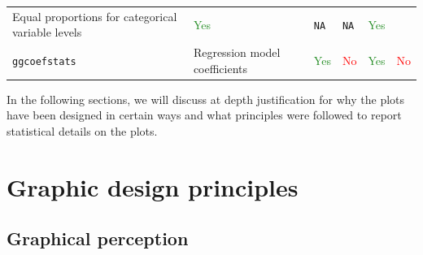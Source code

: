 \documentclass[]{article}
\begin{document}
\begin{longtable}[]{@{}llllll@{}}
\begin{minipage}[t]{0.35\columnwidth}
Equal proportions for categorical variable levels\strut
\end{minipage} & \begin{minipage}[t]{0.08\columnwidth}\raggedright
\textcolor{ForestGreen}{Yes}\strut
\end{minipage} & \begin{minipage}[t]{0.10\columnwidth}\raggedright
\texttt{NA}\strut
\end{minipage} & \begin{minipage}[t]{0.08\columnwidth}\raggedright
\texttt{NA}\strut
\end{minipage} & \begin{minipage}[t]{0.10\columnwidth}\raggedright
\textcolor{ForestGreen}{Yes}\strut
\end{minipage}\tabularnewline
\begin{minipage}[t]{0.14\columnwidth}\raggedright
\texttt{ggcoefstats}\strut
\end{minipage} & \begin{minipage}[t]{0.35\columnwidth}\raggedright
Regression model coefficients\strut
\end{minipage} & \begin{minipage}[t]{0.08\columnwidth}\raggedright
\textcolor{ForestGreen}{Yes}\strut
\end{minipage} & \begin{minipage}[t]{0.10\columnwidth}\raggedright
\textcolor{red}{No}\strut
\end{minipage} & \begin{minipage}[t]{0.08\columnwidth}\raggedright
\textcolor{ForestGreen}{Yes}\strut
\end{minipage} & \begin{minipage}[t]{0.10\columnwidth}\raggedright
\textcolor{red}{No}\strut
\end{minipage}\tabularnewline
\bottomrule
\end{longtable}

In the following sections, we will discuss at depth justification for why the
plots have been designed in certain ways and what principles were followed to
report statistical details on the plots.

\hypertarget{graphic-design-principles}{%
\section{Graphic design principles}\label{graphic-design-principles}}

\hypertarget{graphical-perception}{%
\subsection{Graphical perception}\label{graphical-perception}}
\end{document}
